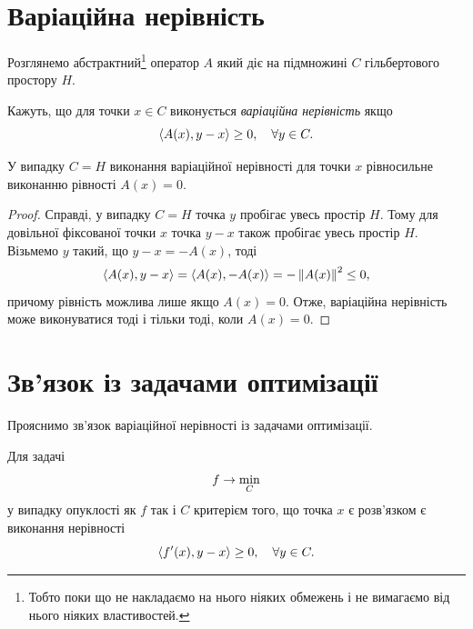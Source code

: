 \section{Варіаційна нерівність}

Розглянемо абстрактний\footnote{Тобто поки що не накладаємо на нього ніяких обмежень і не вимагаємо від нього ніяких властивостей.} оператор $A$ який діє на підмножині $C$ гільбертового простору $H$. 

\begin{definition}
    Кажуть, що для точки $x \in C$ виконується \emph{варіаційна нерівність} якщо
    \begin{equation}
        \sp{A(x), y - x} \ge 0, \quad \forall y \in C.
    \end{equation}
\end{definition}

\begin{proposition}
    У випадку $C = H$ виконання варіаційної нерівності для точки $x$ рівносильне виконанню рівності $A(x) = 0$.
\end{proposition}

\begin{proof}
    Справді, у випадку $C = H$ точка $y$ пробігає увесь простір $H$. Тому для довільної фіксованої точки $x$ точка $y - x$ також пробігає увесь простір $H$. Візьмемо $y$ такий, що $y - x = -A(x)$, тоді 
    \begin{equation}
        \sp{A(x), y - x} = \sp{A(x), -A(x)} = - \no{A(x)}^2 \le 0,
    \end{equation}
    причому рівність можлива лише якщо $A(x) = 0$. Отже, варіаційна нерівність може виконуватися тоді і тільки тоді, коли $A(x) = 0$.
\end{proof}

\section{Зв'язок із задачами оптимізації}

Прояснимо зв'язок варіаційної нерівності із задачами оптимізації. \medskip

\begin{proposition}
    Для задачі
    \begin{equation}
        f \to \Min_C
    \end{equation}
    у випадку опуклості як $f$ так і $C$ критерієм того, що точка $x$ є розв'язком є виконання нерівності
    \begin{equation}
        \sp{f'(x), y - x} \ge 0, \quad \forall y \in C.
    \end{equation}
\end{proposition}

